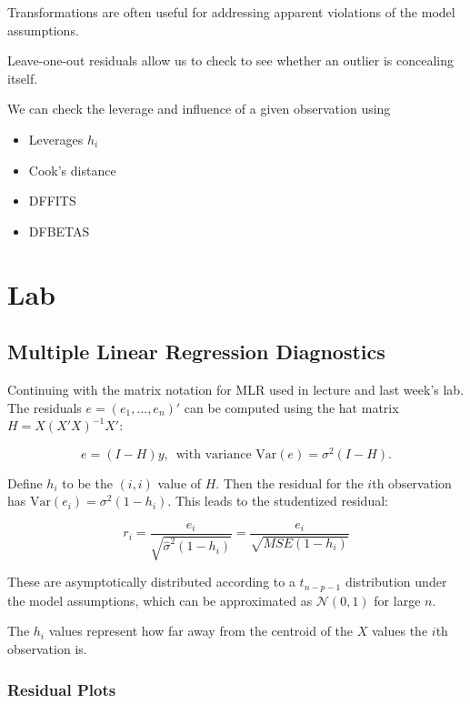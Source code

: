 \documentclass[
  letterpaper,
  DIV=11,
  numbers=noendperiod]{scrreport}
\providecommand{\tightlist}{%
  \setlength{\itemsep}{0pt}\setlength{\parskip}{0pt}}\usepackage{longtable,booktabs,array}
\begin{document}
Transformations are often useful for addressing apparent violations of
the model assumptions.

Leave-one-out residuals allow us to check to see whether an outlier is
concealing itself.

We can check the leverage and influence of a given observation using

\begin{itemize}
\tightlist
\item
  Leverages \(h_i\)
\item
  Cook's distance
\item
  DFFITS
\item
  DFBETAS
\end{itemize}


\hypertarget{lab-2}{%
\chapter{Lab}\label{lab-2}}

\hypertarget{multiple-linear-regression-diagnostics}{%
\section{Multiple Linear Regression
Diagnostics}\label{multiple-linear-regression-diagnostics}}

Continuing with the matrix notation for MLR used in lecture and last
week's lab. The residuals \(e = (e_1, ..., e_n)'\) can be computed using
the hat matrix \(H = X(X'X)^{-1}X'\):

\[e = (I-H)y, \, \text{ with variance } \text{Var}(e) = \sigma^2 (I-H).\]

Define \(h_i\) to be the \((i,i)\) value of \(H\). Then the residual for
the \(i\)th observation has \(\text{Var}(e_i) = \sigma^2 (1-h_i)\). This
leads to the studentized residual:

\[ r_i = \frac{e_i}{\sqrt{\hat \sigma^2 (1-h_i)}} = \frac{e_i}{\sqrt{MSE(1-h_i)}}\]

These are asymptotically distributed according to a \(t_{n-p-1}\)
distribution under the model assumptions, which can be approximated as
\(\mathcal N(0,1)\) for large \(n\).

The \(h_i\) values represent how far away from the centroid of the \(X\)
values the \(i\)th observation is.

\hypertarget{residual-plots}{%
\subsection{Residual Plots}\label{residual-plots}}
\end{document}
